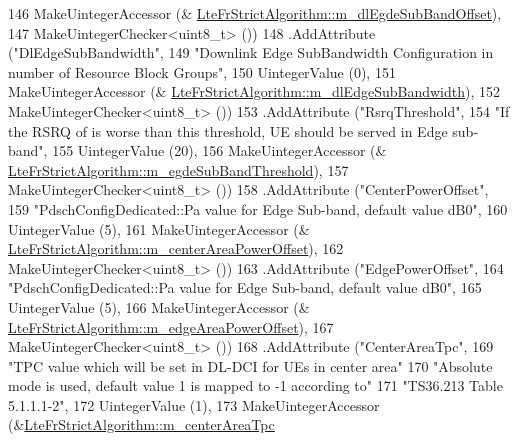 \begin{DoxyCode}
146                    MakeUintegerAccessor (&
      \hyperlink{classns3_1_1LteFrStrictAlgorithm_a14a0d313383204ba31885713420328f5}{LteFrStrictAlgorithm::m\_dlEgdeSubBandOffset}),
147                    MakeUintegerChecker<uint8\_t> ())
148     .AddAttribute (\textcolor{stringliteral}{"DlEdgeSubBandwidth"},
149                    \textcolor{stringliteral}{"Downlink Edge SubBandwidth Configuration in number of Resource Block Groups"},
150                    UintegerValue (0),
151                    MakeUintegerAccessor (&
      \hyperlink{classns3_1_1LteFrStrictAlgorithm_a509afeff3e6cb5c947b6681ed980c59f}{LteFrStrictAlgorithm::m\_dlEdgeSubBandwidth}),
152                    MakeUintegerChecker<uint8\_t> ())
153     .AddAttribute (\textcolor{stringliteral}{"RsrqThreshold"},
154                    \textcolor{stringliteral}{"If the RSRQ of is worse than this threshold, UE should be served in Edge sub-band"},
155                    UintegerValue (20),
156                    MakeUintegerAccessor (&
      \hyperlink{classns3_1_1LteFrStrictAlgorithm_a5b90b8eb56e8cbe457a0ea2f21f68dfe}{LteFrStrictAlgorithm::m\_egdeSubBandThreshold}),
157                    MakeUintegerChecker<uint8\_t> ())
158     .AddAttribute (\textcolor{stringliteral}{"CenterPowerOffset"},
159                    \textcolor{stringliteral}{"PdschConfigDedicated::Pa value for Edge Sub-band, default value dB0"},
160                    UintegerValue (5),
161                    MakeUintegerAccessor (&
      \hyperlink{classns3_1_1LteFrStrictAlgorithm_a02eba937bcdfdd0ae9d6b7840f410611}{LteFrStrictAlgorithm::m\_centerAreaPowerOffset}),
162                    MakeUintegerChecker<uint8\_t> ())
163     .AddAttribute (\textcolor{stringliteral}{"EdgePowerOffset"},
164                    \textcolor{stringliteral}{"PdschConfigDedicated::Pa value for Edge Sub-band, default value dB0"},
165                    UintegerValue (5),
166                    MakeUintegerAccessor (&
      \hyperlink{classns3_1_1LteFrStrictAlgorithm_a554783e976accd5fcd06155049f521ef}{LteFrStrictAlgorithm::m\_edgeAreaPowerOffset}),
167                    MakeUintegerChecker<uint8\_t> ())
168     .AddAttribute (\textcolor{stringliteral}{"CenterAreaTpc"},
169                    \textcolor{stringliteral}{"TPC value which will be set in DL-DCI for UEs in center area"}
170                    \textcolor{stringliteral}{"Absolute mode is used, default value 1 is mapped to -1 according to"}
171                    \textcolor{stringliteral}{"TS36.213 Table 5.1.1.1-2"},
172                    UintegerValue (1),
173                    MakeUintegerAccessor (&\hyperlink{classns3_1_1LteFrStrictAlgorithm_a9929a6d0f943421a03a443a2942706bc}{LteFrStrictAlgorithm::m\_centerAreaTpc}

\end{DoxyCode}
